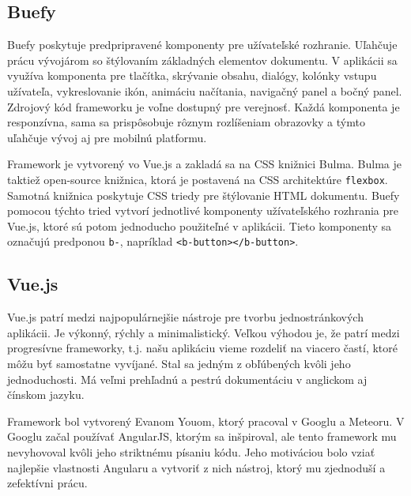 \subsection*{Buefy}
\label{buefy}
Buefy poskytuje predpripravené komponenty pre užívateľské rozhranie. Uľahčuje prácu vývojárom so štýlovaním základných elementov dokumentu. V aplikácii sa využíva komponenta pre tlačítka, skrývanie obsahu, dialógy, kolónky vstupu užívateľa, vykreslovanie ikón, animáciu načítania, navigačný panel a bočný panel. Zdrojový kód frameworku je voľne dostupný pre verejnosť. Každá komponenta je responzívna, sama sa prispôsobuje rôznym rozlíšeniam obrazovky a týmto uľahčuje vývoj aj pre mobilnú platformu. 

Framework je vytvorený vo Vue.js a zakladá sa na CSS knižnici Bulma. Bulma je taktiež open-source knižnica, ktorá je postavená na CSS architektúre \texttt{flexbox}. Samotná knižnica poskytuje CSS triedy pre štýlovanie HTML dokumentu. Buefy pomocou týchto tried vytvorí jednotlivé komponenty užívateľského rozhrania pre Vue.js, ktoré sú potom jednoducho použiteľné v aplikácii. Tieto komponenty sa označujú predponou \texttt{b-}, napríklad \texttt{<b-button></b-button>}.

\subsection{Vue.js}
\label{vue}
Vue.js\cite{vue-guide} patrí medzi najpopulárnejšie nástroje pre tvorbu jednostránkových aplikácii. Je výkonný, rýchly a minimalistický. Veľkou výhodou je, že patrí medzi progresívne frameworky, t.j. našu aplikáciu vieme rozdeliť na viacero častí, ktoré môžu byť samostatne vyvíjané. Stal sa jedným z obľúbených kvôli jeho jednoduchosti. Má veľmi prehľadnú a pestrú dokumentáciu v anglickom aj čínskom jazyku.

Framework bol vytvorený Evanom Youom, ktorý pracoval v Googlu a Meteoru. V Googlu začal používať AngularJS, ktorým sa inšpiroval, ale tento framework mu nevyhovoval kvôli jeho striktnému písaniu kódu. Jeho motiváciou bolo vziať najlepšie vlastnosti Angularu a vytvoriť z nich nástroj, ktorý mu zjednoduší a zefektívni prácu.

